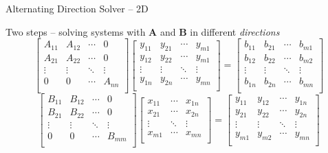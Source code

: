 \documentclass[c]{beamer}
\newcommand{\Mat}[1]{\mathbf{#1}}
\begin{document}
\begin{frame}[fragile]{Alternating Direction Solver -- 2D}

{Two steps} -- solving systems with $\Mat{A}$ and $\Mat{B}$ in different \emph{directions}
\begin{equation*}
  \begin{bmatrix}
    A_{11} & A_{12} & \cdots & 0 \\
    A_{21} & A_{22} & \cdots & 0 \\
    \vdots & \vdots & \ddots & \vdots \\
    0 & 0 & \cdots & A_{nn} \\
  \end{bmatrix}
  \begin{bmatrix}
    y_{11} & y_{21} & \cdots & y_{m1}
    \\
    y_{12} & y_{22} & \cdots & y_{m1}
    \\
    \vdots & \vdots & \ddots & \vdots \\
    y_{1n} & y_{2n} & \cdots & y_{mn}
    \\
  \end{bmatrix}
  =
  \begin{bmatrix}
    b_{11} & b_{21} & \cdots & b_{m1} \\
    b_{12} & b_{22} & \cdots & b_{m2} \\
    \vdots & \vdots & \ddots & \vdots \\
    b_{1n} & b_{2n} & \cdots & b_{mn} \\
  \end{bmatrix}
\end{equation*}
\begin{equation*}
  \begin{bmatrix}
    B_{11} & B_{12} & \cdots & 0 \\
    B_{21} & B_{22} & \cdots & 0 \\
    \vdots & \vdots & \ddots & \vdots \\
    0 & 0 & \cdots & B_{mm} \\
  \end{bmatrix}
  \begin{bmatrix}
    x_{11} & \cdots & x_{1n} \\
    x_{21} & \cdots & x_{2n} \\
    \vdots & \ddots & \vdots \\
    x_{m1} & \cdots & x_{mn} \\
  \end{bmatrix}
  =
  \begin{bmatrix}
    y_{11} &
    y_{12} & \cdots &
    y_{1n} \\
    y_{21} & y_{22} & \cdots & y_{2n} \\
    \vdots & \vdots & \ddots & \vdots \\
    y_{m1} &
    y_{m2} & \cdots &
    y_{mn} \\
  \end{bmatrix}
\end{equation*}


\end{frame}
\end{document}
